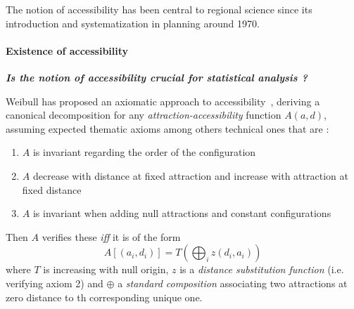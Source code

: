 
The notion of accessibility has been central to regional science since its introduction and systematization in planning around 1970. 

\paragraph{Existence of accessibility}






\textit{\textbf{Is the notion of accessibility crucial for statistical analysis ?}}

\medskip


Weibull has proposed an axiomatic approach to accessibility~\cite{weibull1976axiomatic}, deriving a canonical decomposition for any \emph{attraction-accessibility} function $A(a,d)$, assuming expected thematic axioms among others technical ones that are :
\begin{enumerate}
\item \footnotesize $A$ is invariant regarding the order of the configuration
\item \footnotesize $A$ decrease with distance at fixed attraction and increase with attraction at fixed distance
\item \footnotesize $A$ is invariant when adding null attractions and constant configurations
\end{enumerate}
Then $A$ verifies these \emph{iff} it is of the form
\[
A\left[(a_i,d_i)\right] = T\left(\bigoplus_i z(d_i,a_i)\right)
\]
where $T$ is increasing with null origin, $z$ is a \emph{distance substitution function} (i.e. verifying axiom 2) and $\oplus$ a \emph{standard composition} associating two attractions at zero distance to th corresponding unique one. 

